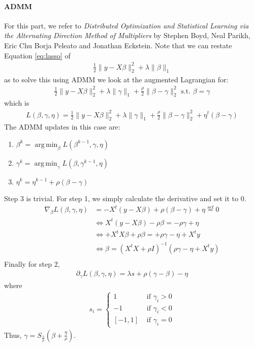 \documentclass[12pt, leqno]{article}
\providecommand{\norm}[1]{\lVert#1\rVert} %
\DeclareMathOperator*{\argmin}{arg\,min}
\begin{document}
\pagebreak


\paragraph{ADMM} For this part, we refer to {\it Distributed Optimization and Statistical
Learning via the Alternating Direction
Method of Multipliers} by Stephen Boyd, Neal Parikh, Eric Chu
Borja Peleato and Jonathan Eckstein. Note that we can restate
Equation \ref{eq:lasso} of
\begin{align*}
\frac{1}{2}\norm{y- X \beta}_2^2 + \lambda
  \norm{\beta}_1 
\end{align*}
as to solve this using ADMM we look at the augmented Lagrangian for: 
\begin{align*}
 \frac{1}{2}\norm{y- X \beta}_2^2 + \lambda
  \norm{\gamma}_1 + \frac{\rho}{2} \norm{\beta - \gamma}_2^2 \text{ s.t. } \beta = \gamma
\end{align*}
which is
\begin{align*}
L(\beta, \gamma, \eta) = \frac{1}{2}\norm{y- X \beta}_2^2 + \lambda
  \norm{\gamma}_1 + \frac{\rho}{2} \norm{\beta - \gamma}_2^2 + \eta^t(\beta - \gamma)
\end{align*}
The ADMM updates in this case are:
\begin{enumerate}
\item $\beta^{k} = \argmin_\beta L(\beta^{k-1}, \gamma, \eta)$
\item $\gamma^{k} = \argmin_\gamma L(\beta, \gamma^{k-1}, \eta)$
\item $\eta^{k} = \eta^{k-1}+ \rho(\beta - \gamma)$
\end{enumerate}
Step 3 is trivial. For step 1, we simply calculate the derivative and
set it to 0. 
\begin{align*}
\nabla_\beta L(\beta, \gamma, \eta) &=  -X^t (y -X \beta) + \rho (\beta
  - \gamma) + \eta \overset{set}{=} 0\\
&\iff X^t (y -X \beta) - \rho \beta = - \rho \gamma + \eta \\ 
&\iff + X^t X \beta + \rho \beta = + \rho \gamma - \eta + X^ty \\ 
&\iff \beta =  (X^t X + \rho I)^{-1}  (\rho \gamma - \eta + X^ty) \\ 
\end{align*}
Finally for step 2, 
\begin{align*}
\partial_\gamma L(\beta, \gamma, \eta) = \lambda s + \rho (\gamma -
  \beta)  - \eta
\end{align*}
where 
\begin{align*}
s_i = \begin{cases}
1 &\text{ if } \gamma_i > 0 \\
-1 &\text{ if } \gamma_i< 0 \\
[-1,1] &\text{ if } \gamma_i = 0
\end{cases}
\end{align*}
Thus, $\gamma = S_{\frac{\lambda}{\rho}}(\beta + \frac{\eta}{\rho})$.
\end{document}
